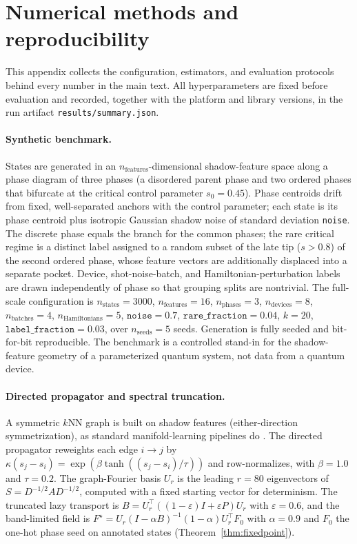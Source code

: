 \documentclass[aps,prresearch,reprint,amsmath,amssymb,nofootinbib,superscriptaddress,floatfix]{revtex4-2}
\theoremstyle{definition}
\theoremstyle{remark}
\theoremstyle{plain}
\begin{document}
\section{Numerical methods and reproducibility}
\label{sec:methods}
This appendix collects the configuration, estimators, and evaluation protocols behind every number in the
main text. All hyperparameters are fixed before evaluation and recorded, together with the platform and
library versions, in the run artifact \texttt{results/summary.json}.

\paragraph{Synthetic benchmark.}
States are generated in an $n_\text{features}$-dimensional shadow-feature space along a phase diagram of
three phases (a disordered parent phase and two ordered phases that bifurcate at the critical control
parameter $s_0=0.45$). Phase centroids drift from fixed, well-separated anchors with the control parameter;
each state is its phase centroid plus isotropic Gaussian shadow noise of standard deviation \texttt{noise}.
The discrete phase equals the branch for the common phases; the rare critical regime is a distinct label
assigned to a random subset of the late tip ($s>0.8$) of the second ordered phase, whose feature vectors are
additionally displaced into a separate pocket. Device, shot-noise-batch, and Hamiltonian-perturbation labels
are drawn independently of phase so that grouping splits are nontrivial. The full-scale configuration is
$n_\text{states}=\num{3000}$, $n_\text{features}=\num{16}$, $n_\text{phases}=3$, $n_\text{devices}=8$,
$n_\text{batches}=4$, $n_\text{Hamiltonians}=5$, $\texttt{noise}=0.7$, $\texttt{rare\_fraction}=0.04$,
$k=\num{20}$, $\texttt{label\_fraction}=0.03$, over $n_\text{seeds}=5$ seeds. Generation is fully seeded and
bit-for-bit reproducible. The benchmark is a controlled stand-in for the shadow-feature geometry of a
parameterized quantum system, not data from a quantum device.

\paragraph{Directed propagator and spectral truncation.}
A symmetric $k$NN graph is built on shadow features (either-direction symmetrization), as standard
manifold-learning pipelines do \cite{coifman2006diffusion}. The directed propagator reweights each edge
$i\!\to\!j$ by $\kappa(s_j-s_i)=\exp(\beta\tanh((s_j-s_i)/\tau))$ and row-normalizes, with $\beta=1.0$ and
$\tau=0.2$. The graph-Fourier basis $U_r$ is the leading $r=\num{80}$ eigenvectors of
$S=D^{-1/2}AD^{-1/2}$, computed with a fixed starting vector for determinism. The truncated lazy transport
is $B=U_r^\top((1-\varepsilon)I+\varepsilon P)U_r$ with $\varepsilon=0.6$, and the band-limited field is
$F^\star=U_r(I-\alpha B)^{-1}(1-\alpha)U_r^\top F_0$ with $\alpha=0.9$ and $F_0$ the one-hot phase seed on
annotated states (Theorem~\ref{thm:fixedpoint}).
\end{document}
